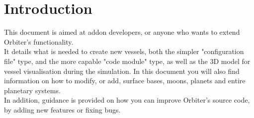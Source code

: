 \documentclass[Orbiter Developer Manual.tex]{subfiles}
\begin{document}
\section{Introduction}
This document is aimed at addon developers, or anyone who wants to extend Orbiter's functionality.\\
It details what is needed to create new vessels, both the simpler "configuration file" type, and the more capable "code module" type, as well as the 3D model for vessel visualisation during the simulation.
In this document you will also find information on how to modify, or add, surface bases, moons, planets and entire planetary systems.\\
In addition, guidance is provided on how you can improve Orbiter's source code, by adding new features or fixing bugs.
\end{document}
